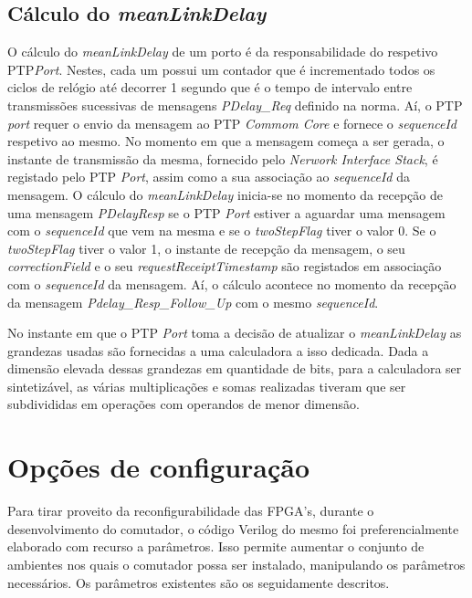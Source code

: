 \subsection{Cálculo do \textit{meanLinkDelay}}
O cálculo do \textit{meanLinkDelay} de um porto é da responsabilidade do respetivo PTP\textit{Port}. Nestes, cada um possui um contador que é incrementado todos os ciclos de relógio até decorrer 1 segundo que é o tempo de intervalo entre transmissões sucessivas de mensagens \textit{PDelay\_Req} definido na norma. Aí, o PTP \textit{port} requer o envio da mensagem ao PTP \textit{Commom Core} e fornece o \textit{sequenceId} respetivo ao mesmo. No momento em que a mensagem começa a ser gerada, o instante de transmissão da mesma, fornecido pelo \textit{Nerwork Interface Stack}, é registado pelo PTP \textit{Port}, assim como a sua associação ao \textit{sequenceId} da mensagem. O cálculo do \textit{meanLinkDelay} inicia-se no momento da recepção de uma mensagem \textit{PDelayResp} se o PTP \textit{Port} estiver a aguardar uma mensagem com o \textit{sequenceId} que vem na mesma e se o \textit{twoStepFlag} tiver o valor 0. Se o \textit{twoStepFlag} tiver o valor 1, o instante de recepção da mensagem, o seu \textit{correctionField} e o seu \textit{requestReceiptTimestamp} são registados em associação com o \textit{sequenceId} da mensagem. Aí, o cálculo acontece no momento da recepção da mensagem \textit{Pdelay\_Resp\_Follow\_Up} com o mesmo \textit{sequenceId}.\par
No instante em que o PTP \textit{Port} toma a decisão de atualizar o \textit{meanLinkDelay} as grandezas usadas são fornecidas a uma calculadora a isso dedicada. Dada a dimensão elevada dessas grandezas em quantidade de bits, para a calculadora ser sintetizável, as várias multiplicações e somas realizadas tiveram que ser subdivididas em operações com operandos de menor dimensão. 


\section{Opções de configuração}

Para tirar proveito da reconfigurabilidade das FPGA's, durante o desenvolvimento do comutador, o código Verilog do mesmo foi preferencialmente elaborado com recurso a parâmetros. Isso permite aumentar o conjunto de ambientes nos quais o comutador possa ser instalado, manipulando os parâmetros necessários. Os parâmetros existentes são os seguidamente descritos.


